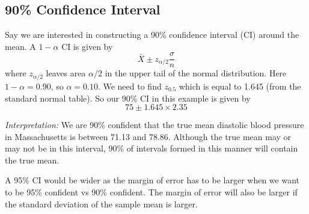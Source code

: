 \documentclass{./../../Latex/handout}
\begin{document}
\subsection*{90\% Confidence Interval} 

Say we are interested in constructing a 90\% confidence interval (CI) around the mean. A $1-\alpha$ CI is given by
$$ \bar{X} \pm z_{\alpha/2} \frac{\sigma}{n} $$
where $z_{\alpha/2}$ leaves area $\alpha/2$ in the upper tail of the normal distribution.
Here $1-\alpha = 0.90$, so $\alpha=0.10$. We need to find $z_{0.5}$ which is equal to 1.645 (from the standard normal table). So our 90\% CI in this example is given by 
$$ 75 \pm1.645 \times 2.35 $$

\textit{Interpretation:} We are 90\% confident that the true mean diastolic blood pressure in Massachusetts is between 71.13 and 78.86. Although the true mean may or may not be in this interval, 90\% of intervals formed in this manner will contain the true mean. 

A 95\% CI would be wider as the margin of error has to be larger when we want to be 95\% confident vs 90\% confident. The margin of error will also be larger if the standard deviation of the sample mean is larger.
\end{document}
